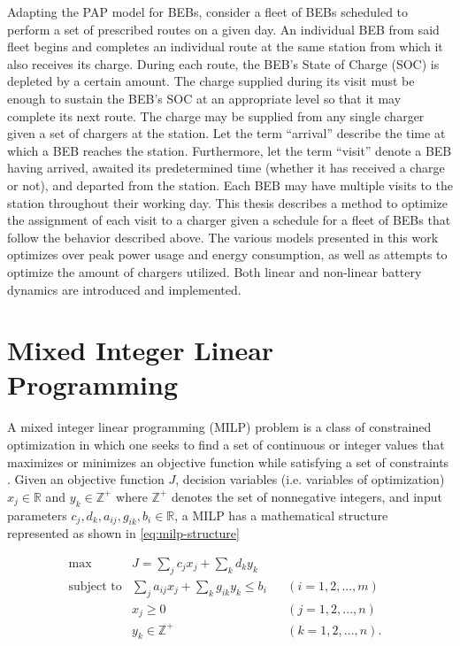 \documentclass[ee,thesis]{usuthesis}
\begin{document}
Adapting the PAP model for BEBs, consider a fleet of BEBs scheduled to perform a set of prescribed routes on a given
day. An individual BEB from said fleet begins and completes an individual route at the same station from which it also
receives its charge. During each route, the BEB's State of Charge (SOC) is depleted by a certain amount. The charge
supplied during its visit must be enough to sustain the BEB's SOC at an appropriate level so that it may complete its
next route. The charge may be supplied from any single charger given a set of chargers at the station. Let the term
``arrival'' describe the time at which a BEB reaches the station. Furthermore, let the term ``visit'' denote a BEB having
arrived, awaited its predetermined time (whether it has received a charge or not), and departed from the station. Each
BEB may have multiple visits to the station throughout their working day. This thesis describes a method to optimize the
assignment of each visit to a charger given a schedule for a fleet of BEBs that follow the behavior described above. The
various models presented in this work optimizes over peak power usage and energy consumption, as well as attempts to
optimize the amount of chargers utilized. Both linear and non-linear battery dynamics are introduced and implemented.

\section{Mixed Integer Linear Programming}
\label{sec:org4de5e43}

A mixed integer linear programming (MILP) problem is a class of constrained optimization in which one seeks to find a
set of continuous or integer values that maximizes or minimizes an objective function while satisfying a set of
constraints \cite{chen-2010-applied}. Given an objective function \(J\), decision variables (i.e. variables of
optimization) \(x_j \in \mathbb{R}\) and \(y_k \in \mathbb{Z}^+\) where \(\mathbb{Z}^+\) denotes the set of nonnegative integers, and input parameters \(c_j,
d_k, a_{ij}, g_{ik}, b_i \in \mathbb{R}\), a MILP has a mathematical structure represented as shown in \ref{eq:milp-structure}
\cite{chen-2010-applied}

\begin{subequations}
\label{eq:milp-structure}
\begin{align}
&\text{max}        &J = \sum_j c_j x_j + \sum_k d_k y_k&         &               &\label{eq:fuzzy-milp-objective}\\
&\text{subject to} &\sum_j a_{ij} x_j + \sum_k g_{ik} y_k \le b_i&  &(i = 1,2,...,m)& \label{eq:fuzzy-milp-constraint}\\
&                  &x_j \ge 0&                              &(j = 1,2,...,n)& \label{eq:fuzzy-milp-continuous}\\
&                  &y_k \in \mathbb{Z^+}&                   &(k = 1,2,...,n)\text{.}& \label{eq:fuzzy-milp-integer}
&\end{align}
\end{subequations}
\end{document}
